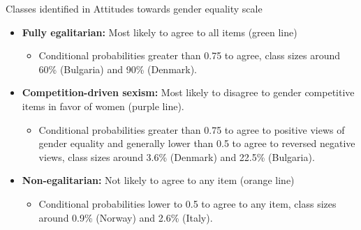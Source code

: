 \documentclass[11pt,t]{beamer}
\begin{document}
\begin{frame}{Classes identified in Attitudes towards gender equality scale}
\vspace{-5pt}

\begin{itemize}
\item \textbf{Fully egalitarian:} Most likely to agree to all items (green line)

\begin{itemize}
	\item Conditional probabilities greater than 0.75 to agree, class sizes around 60\% (Bulgaria) and 90\% (Denmark).  
\end{itemize}
\vspace{5pt}
\item \textbf{Competition-driven sexism:} Most likely to disagree to gender competitive items in favor of women (purple line). 

\begin{itemize}
	\item Conditional probabilities greater than 0.75 to agree to positive views of gender equality and generally lower than 0.5 to agree to reversed negative views, class sizes around 3.6\% (Denmark) and 22.5\% (Bulgaria).  
\end{itemize}
\vspace{5pt}

\item \textbf{Non-egalitarian:} Not likely to agree to any item (orange line)

\begin{itemize}
	\item Conditional probabilities lower to 0.5 to agree to any item, class sizes around 0.9\% (Norway) and 2.6\% (Italy).  
\end{itemize}

\end{itemize}
\end{frame} 
\end{document}
